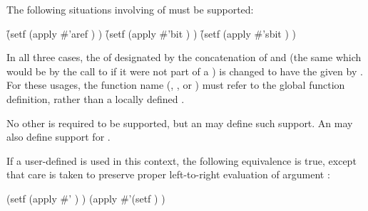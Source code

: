\endsubsubsection%
     

The following situations involving  of  must be supported:

\beginlist
\itemitem{\bull} \f{(setf (apply \#'aref 
					)
			  )}
\itemitem{\bull} \f{(setf (apply \#'bit  
				       )
			  )}
\itemitem{\bull} \f{(setf (apply \#'sbit  
					) 
			  )}
\endlist

In all three cases, the  of  designated
by the concatenation of  and 
(\ie the same  which would be  by the call to
      if it were not part of a  )
is changed to have the  given by .
For these usages, the function name (, , or )
must refer to the global function definition, rather than a locally defined
.

No other   is required to be supported,
but an  may define such support.
An  may also define support 
for  .

If a user-defined  is used in this context,
the following equivalence is true, except that care is taken
to preserve proper left-to-right evaluation of argument :

\code
 (setf (apply \#' ) )
 \EQ (apply \#'(setf )  )
\endcode


\endsubsubsection%


